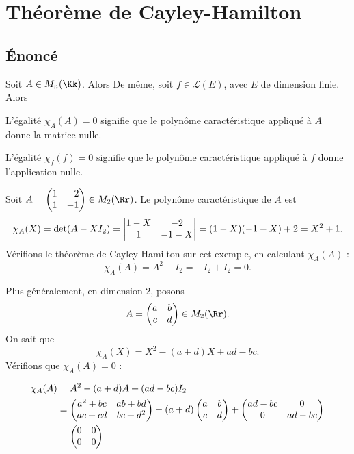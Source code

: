 \documentclass[12pt, class=report,crop=false]{standalone}
\begin{document}
\section{Théorème de Cayley-Hamilton}

\subsection{Énoncé}


\begin{theoreme}
\label{th:cayley-hamilton}
Soit $A \in M_n(\Kk)$. Alors
De même, soit $f \in \mathcal{L}(E)$, avec $E$  de dimension finie. Alors 
\end{theoreme}

L'égalité $\chi_A(A) = 0$ signifie que le polynôme caractéristique appliqué à $A$ donne la matrice nulle.

L'égalité $\chi_f(f) = 0$ signifie que le polynôme caractéristique appliqué à $f$ donne l'application nulle.

\begin{exemple}
Soit $A=\begin{pmatrix}1&-2\cr1&-1\end{pmatrix}\in M_2(\Rr)$.
Le polynôme caractéristique de $A$ est 
$$\chi_A(X)=\det(A-X I_2) = \begin{vmatrix}1-X&-2\cr 1&-1-X\end{vmatrix}=(1-X)(-1-X)+2=X^2+1.$$
Vérifions le théorème de Cayley-Hamilton sur cet exemple, en calculant $\chi_A(A)$ :
$$\chi_A(A) = A^2+I_2 = -I_2 + I_2 = 0.$$ 
\end{exemple}


\begin{exemple}
Plus généralement, en dimension $2$, posons 
$$A=\left(\begin{matrix}a&b\cr c&d\end{matrix}\right)\in M_2(\Rr).$$ 
On sait que  
$$\chi_A(X) = X^2-(a+d)X+ad-bc.$$
Vérifions que $\chi_A(A) = 0$ :

\begin{align*}
\chi_A(A)
  &=A^2-(a+d)A+(ad-bc)I_2 \\
  &=\begin{pmatrix}a^2+bc&ab+bd\cr ac+cd&bc+d^2\end{pmatrix}-
(a+d)\begin{pmatrix}a&b\cr c&d\end{pmatrix}+\begin{pmatrix}ad-bc&0\cr 0&ad-bc\end{pmatrix} \\
  &= \begin{pmatrix}0&0\cr 0&0\end{pmatrix}
\end{align*}
\end{exemple} 
\end{document}

